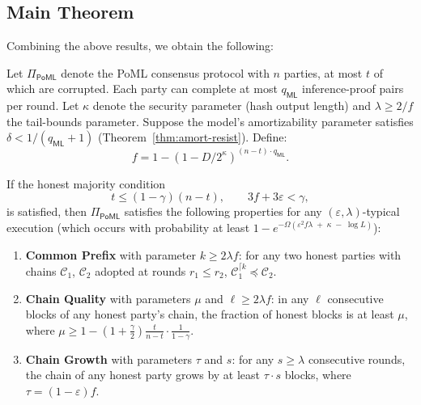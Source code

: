
\subsection{Main Theorem}

Combining the above results, we obtain the following:

\begin{theorem}
\label{thm:main-reduction}
Let $\Pi_{\mathsf{PoML}}$ denote the PoML consensus protocol with $n$ parties, at most $t$ of which are corrupted. Each party can complete at most $q_{\mathsf{ML}}$ inference-proof pairs per round. Let $\kappa$ denote the security parameter (hash output length) and $\lambda \geq 2/f$ the tail-bounds parameter. Suppose the model's amortizability parameter satisfies $\delta < 1/(q_{\mathsf{ML}} + 1)$ (Theorem~\ref{thm:amort-resist}). Define:
\[
    f = 1 - (1 - D / 2^\kappa)^{(n-t) \cdot q_{\mathsf{ML}}}.
\]

If the honest majority condition
\[
    t \leq (1 - \gamma)(n - t), \qquad 3f + 3\varepsilon < \gamma,
\]
is satisfied, then $\Pi_{\mathsf{PoML}}$ satisfies the following properties for any $(\varepsilon, \lambda)$-typical execution (which occurs with probability at least $1 - e^{-\Omega(\varepsilon^2 f \lambda \;+\; \kappa \;-\; \log L)}$):
\begin{enumerate}
    \item \textbf{Common Prefix} with parameter $k \geq 2\lambda f$: for any two honest parties with chains $\mathcal{C}_1$, $\mathcal{C}_2$ adopted at rounds $r_1 \leq r_2$, $\mathcal{C}_1^{\lceil k} \preceq \mathcal{C}_2$.
    \item \textbf{Chain Quality} with parameters $\mu$ and $\ell \geq 2\lambda f$: in any $\ell$ consecutive blocks of any honest party's chain, the fraction of honest blocks is at least $\mu$, where $\mu \geq 1 - (1 + \frac{\gamma}{2}) \frac{t}{n - t} \cdot \frac{1}{1 - \gamma}$.
    \item \textbf{Chain Growth} with parameters $\tau$ and $s$: for any $s \geq \lambda$ consecutive rounds, the chain of any honest party grows by at least $\tau \cdot s$ blocks, where $\tau = (1 - \varepsilon)f$.
\end{enumerate}
\end{theorem}

